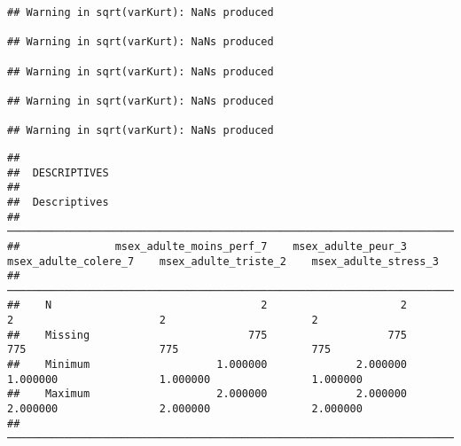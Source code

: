 \documentclass[
]{article}
\begin{document}
\begin{verbatim}
## Warning in sqrt(varKurt): NaNs produced

## Warning in sqrt(varKurt): NaNs produced

## Warning in sqrt(varKurt): NaNs produced

## Warning in sqrt(varKurt): NaNs produced

## Warning in sqrt(varKurt): NaNs produced
\end{verbatim}

\begin{verbatim}
## 
##  DESCRIPTIVES
## 
##  Descriptives                                                                                                                          
##  ───────────────────────────────────────────────────────────────────────────────────────────────────────────────────────────────────── 
##               msex_adulte_moins_perf_7    msex_adulte_peur_3    msex_adulte_colere_7    msex_adulte_triste_2    msex_adulte_stress_3   
##  ───────────────────────────────────────────────────────────────────────────────────────────────────────────────────────────────────── 
##    N                                 2                     2                       2                       2                       2   
##    Missing                         775                   775                     775                     775                     775   
##    Minimum                    1.000000              2.000000                1.000000                1.000000                1.000000   
##    Maximum                    2.000000              2.000000                2.000000                2.000000                2.000000   
##  ─────────────────────────────────────────────────────────────────────────────────────────────────────────────────────────────────────
\end{verbatim}
\end{document}
